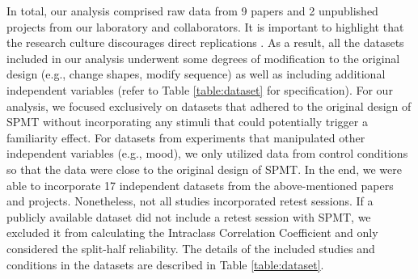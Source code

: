 \documentclass[sn-apa]{sn-jnl}%
\theoremstyle{thmstyleone}%
\theoremstyle{thmstyletwo}%
\theoremstyle{thmstylethree}%
\begin{document}
In total, our analysis comprised raw data from 9 papers and 2 unpublished projects from our laboratory and collaborators. It is important to highlight that the research culture discourages direct replications \parencite{makel2012replications}. As a result, all the datasets included in our analysis underwent some degrees of modification to the original design (e.g., change shapes, modify sequence) as well as including additional independent variables (refer to Table \ref{table:dataset} for specification). For our analysis, we focused exclusively on datasets that adhered to the original design of SPMT without incorporating any stimuli that could potentially trigger a familiarity effect. For datasets from experiments that manipulated other independent variables (e.g., mood), we only utilized data from control conditions so that the data were close to the original design of SPMT. In the end, we were able to incorporate 17 independent datasets from the above-mentioned papers and projects. Nonetheless, not all studies incorporated retest sessions. If a publicly available dataset did not include a retest session with SPMT, we excluded it from calculating the Intraclass Correlation Coefficient and only considered the split-half reliability. The details of the included studies and conditions in the datasets are described in Table \ref{table:dataset}. 
\clearpage
\end{document}
